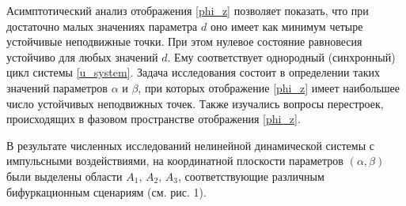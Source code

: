 \documentclass[12pt]{extarticle}
\begin{document}
Асимптотический анализ отображения \eqref{phi_z} позволяет показать, что при достаточно малых значениях параметра $ d $ оно имеет как минимум четыре устойчивые неподвижные точки. При этом нулевое состояние равновесия устойчиво для любых значений $ d $. Ему соответствует однородный (синхронный) цикл системы \eqref{u_system}. Задача исследования состоит в определении таких значений параметров $ \alpha $ и $ \beta $, при которых отображение \eqref{phi_z} имеет наибольшее число устойчивых неподвижных точек. Также изучались вопросы перестроек, происходящих в фазовом пространстве отображения \eqref{phi_z}.

В результате численных исследований нелинейной динамической системы с импульсными воздействиями, на координатной плоскости параметров $ (\alpha, \beta) $ были выделены области $ A_1, \, A_2, \, A_3 $, соответствующие различным бифуркационным сценариям (см. рис. 1). 
\end{document}
